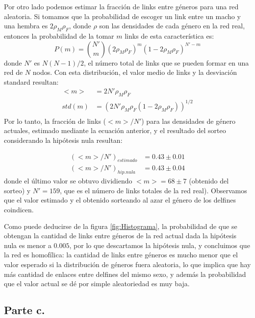 \par Por otro lado podemos estimar la fracción de links entre géneros para una red aleatoria. Si tomamos que la probabilidad de escoger un link entre un macho y una hembra es $2 \rho_{M} \rho_{F}$, donde $\rho$ son las densidades de cada género en la red real, entonces la probabilidad de la tomar $m$ links de esta característica es:
\begin{equation}
	P(m) = {N' \choose m} (2 \rho_{M} \rho_{F})^{m} (1 - 2 \rho_{M} \rho_{F})^{N' - m}
\end{equation}
donde $N'$ es $N(N-1)/2$, el número total de links que se pueden formar en una red de $N$ nodos. Con esta distribución, el valor medio de links y la desviación standard resultan:
\begin{align*}
	<m> & = 2 N' \rho_{M} \rho_{F} \\
	std(m) & = (2 N' \rho_{M} \rho_{F} (1 - 2 \rho_{M} \rho_{F}))^{1/2}\\
\end{align*}
Por lo tanto, la fracción de links ($<m>/N'$) para las densidades de género actuales, estimado mediante la ecuación anterior, y el resultado del sorteo considerando la hipótesis nula resultan:

\begin{align*}
	(<m>/N')_{estimado} & = 0.43 \pm 0.01 \\
	(<m>/N')_{hip.nula} & = 0.43 \pm 0.04
\end{align*}
donde el último valor se obtuvo dividiendo $<m> = 68 \pm 7$ (obtenido del sorteo) y $N' = 159$, que es el número de links totales de la red real). Observamos que el valor estimado y el obtenido sorteando al azar el género de los delfines coindicen.
\par Como puede deducirse de la figura \ref{fig:Histograma}, la probabilidad de que se obtengan la cantidad de links entre géneros de la red actual dada la hipótesis nula es menor a $0.005$, por lo que descartamos la hipótesis nula, y concluimos que la red es homofílica: la cantidad de links entre géneros es mucho menor que el valor esperado si la distribución de géneros fuera aleatoria, lo que implica que hay más cantidad de enlaces entre delfines del mismo sexo, y además la probabilidad que el valor actual se dé por simple aleatoriedad es muy baja.

\subsection{Parte c.}

